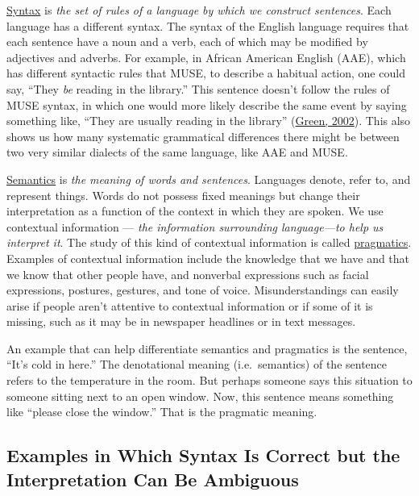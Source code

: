 \documentclass[
]{krantz}
\begin{document}
\protect\hyperlink{syntax}{Syntax} is \emph{the set of rules of a language by which we construct sentences}. Each language has a different syntax. The syntax of the English language requires that each sentence have a noun and a verb, each of which may be modified by adjectives and adverbs. For example, in African American English (AAE), which has different syntactic rules that MUSE, to describe a habitual action, one could say, ``They \emph{be} reading in the library.'' This sentence doesn't follow the rules of MUSE syntax, in which one would more likely describe the same event by saying something like, ``They are usually reading in the library'' (\protect\hyperlink{ref-green2002}{Green, 2002}). This also shows us how many systematic grammatical differences there might be between two very similar dialects of the same language, like AAE and MUSE.

\protect\hyperlink{semantics}{Semantics} is \emph{the meaning of words and sentences}. Languages denote, refer to, and represent things. Words do not possess fixed meanings but change their interpretation as a function of the context in which they are spoken. We use contextual information --- \emph{the information surrounding language---to help us interpret it}. The study of this kind of contextual information is called \protect\hyperlink{pragmatics}{pragmatics}. Examples of contextual information include the knowledge that we have and that we know that other people have, and nonverbal expressions such as facial expressions, postures, gestures, and tone of voice. Misunderstandings can easily arise if people aren't attentive to contextual information or if some of it is missing, such as it may be in newspaper headlines or in text messages.

An example that can help differentiate semantics and pragmatics is the sentence, ``It's cold in here.'' The denotational meaning (i.e.~semantics) of the sentence refers to the temperature in the room. But perhaps someone says this situation to someone sitting next to an open window. Now, this sentence means something like ``please close the window.'' That is the pragmatic meaning.

\hypertarget{examples-in-which-syntax-is-correct-but-the-interpretation-can-be-ambiguous}{%
\subsection*{Examples in Which Syntax Is Correct but the Interpretation Can Be Ambiguous}\label{examples-in-which-syntax-is-correct-but-the-interpretation-can-be-ambiguous}}
\end{document}
